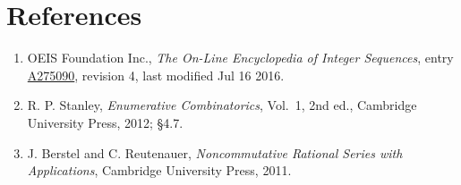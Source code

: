 \documentclass[11pt]{article}
\theoremstyle{definition}
\begin{document}
\section{References}

\begin{enumerate}

\item OEIS Foundation Inc., \emph{The On-Line Encyclopedia of Integer Sequences}, entry \href{https://oeis.org/A275090}{A275090}, revision 4, last modified Jul 16 2016.

\item R. P. Stanley, \emph{Enumerative Combinatorics}, Vol.~1, 2nd ed., Cambridge University Press, 2012; \S4.7.

\item J. Berstel and C. Reutenauer, \emph{Noncommutative Rational Series with Applications}, Cambridge University Press, 2011.

\end{enumerate}
\end{document}
